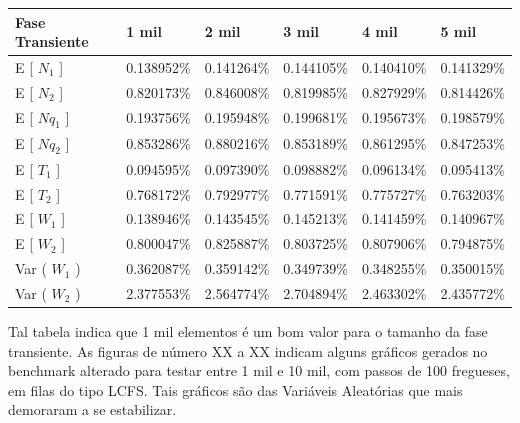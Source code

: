 \documentclass[a4paper,10pt]{article}
\begin{document}
\begin{center}
\begin{tabular} { | l | l | l | l | l | l | }
    \hline
    Fase Transiente & 1 mil      & 2 mil      & 3 mil      & 4 mil      & 5 mil     \\ \hline
    E [ $N_1$ ]     & 0.138952\% & 0.141264\% & 0.144105\% & 0.140410\% & 0.141329\% \\ \hline
    E [ $N_2$ ]     & 0.820173\% & 0.846008\% & 0.819985\% & 0.827929\% & 0.814426\% \\ \hline
    E [ $Nq_1$ ]    & 0.193756\% & 0.195948\% & 0.199681\% & 0.195673\% & 0.198579\% \\ \hline
    E [ $Nq_2$ ]    & 0.853286\% & 0.880216\% & 0.853189\% & 0.861295\% & 0.847253\% \\ \hline
    E [ $T_1$ ]     & 0.094595\% & 0.097390\% & 0.098882\% & 0.096134\% & 0.095413\% \\ \hline
    E [ $T_2$ ]     & 0.768172\% & 0.792977\% & 0.771591\% & 0.775727\% & 0.763203\% \\ \hline
    E [ $W_1$ ]     & 0.138946\% & 0.143545\% & 0.145213\% & 0.141459\% & 0.140967\% \\ \hline
    E [ $W_2$ ]     & 0.800047\% & 0.825887\% & 0.803725\% & 0.807906\% & 0.794875\% \\ \hline
    Var ( $W_1$ )   & 0.362087\% & 0.359142\% & 0.349739\% & 0.348255\% & 0.350015\% \\ \hline
    Var ( $W_2$ )   & 2.377553\% & 2.564774\% & 2.704894\% & 2.463302\% & 2.435772\% \\ \hline
\end{tabular}
\end{center}

    Tal tabela indica que 1 mil elementos é um bom valor para o tamanho da fase transiente. As figuras de número XX a XX indicam alguns gráficos gerados no
benchmark alterado para testar entre 1 mil e 10 mil, com passos de 100 fregueses, em filas do tipo LCFS. Tais gráficos são das Variáveis Aleatórias que mais
demoraram a se estabilizar.

\pagebreak
\end{document}
